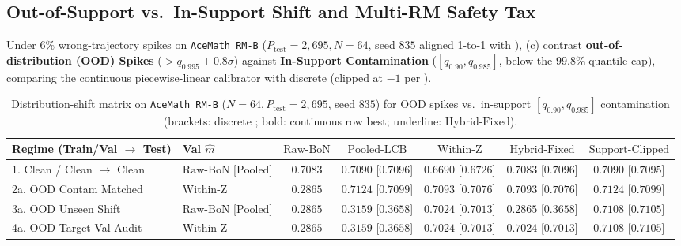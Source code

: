 \documentclass[10pt]{article}
\theoremstyle{plain}
\theoremstyle{definition}
\theoremstyle{remark}
\begin{document}
\subsection{Out-of-Support vs.\ In-Support Shift and Multi-RM Safety Tax}

Under $6\%$ wrong-trajectory spikes on \texttt{AceMath RM-B} ($P_{\mathrm{test}}=2{,}695, N=64$, seed $835$ aligned 1-to-1 with ), (c) contrast \textbf{out-of-distribution (OOD) Spikes} ($> q_{0.995} + 0.8\sigma$) against \textbf{In-Support Contamination} ($[q_{0.90}, q_{0.985}]$, below the $99.8\%$ quantile cap), comparing the continuous piecewise-linear calibrator with discrete  (clipped at $-1$ per ).

\begin{table}[htbp]
\centering
\caption{Distribution-shift matrix on \texttt{AceMath RM-B} ($N=64, P_{\mathrm{test}}=2{,}695$, seed $835$) for OOD spikes vs.\ in-support $[q_{0.90}, q_{0.985}]$ contamination (brackets: discrete ; bold: continuous row best; underline: $\mathrm{Hybrid\text{-}Fixed}$).}
\label{tab:shift}
\scriptsize
\setlength{\tabcolsep}{1.6pt}
\begin{tabular}{llccccc}
\toprule
Regime (Train/Val $\to$ Test) & Val $\hat{m}$ & $\mathrm{Raw\text{-}BoN}$ & $\mathrm{Pooled\text{-}LCB}$ & $\mathrm{Within\text{-}Z}$ & $\mathrm{Hybrid\text{-}Fixed}$ & $\mathrm{Support\text{-}Clipped}$ \\
\midrule
1. Clean / Clean $\to$ Clean              & $\mathrm{Raw\text{-}BoN}$ [$\mathrm{Pooled}$]  & $0.7083$ & $\mathbf{0.7090}$ [$0.7096$] & $0.6690$ [$0.6726$] & \underline{$0.7083$} [$0.7096$] & $\mathbf{0.7090}$ [$0.7095$] \\
2a. OOD Contam Matched                    & $\mathrm{Within\text{-}Z}$                     & $0.2865$ & $\mathbf{0.7124}$ [$0.7099$] & $0.7093$ [$0.7076$] & \underline{$0.7093$} [$0.7076$] & $\mathbf{0.7124}$ [$0.7099$] \\
3a. OOD Unseen Shift                      & $\mathrm{Raw\text{-}BoN}$ [$\mathrm{Pooled}$]  & $0.2865$ & $0.3159$ [$0.3658$] & $0.7024$ [$0.7013$] & \underline{$0.2865$} [$0.3658$] & $\mathbf{0.7108}$ [$0.7105$] \\
4a. OOD Target Val Audit                  & $\mathrm{Within\text{-}Z}$                     & $0.2865$ & $0.3159$ [$0.3658$] & $0.7024$ [$0.7013$] & \underline{$0.7024$} [$0.7013$] & $\mathbf{0.7108}$ [$0.7105$] \\

\end{tabular}
\end{table}
\end{document}
